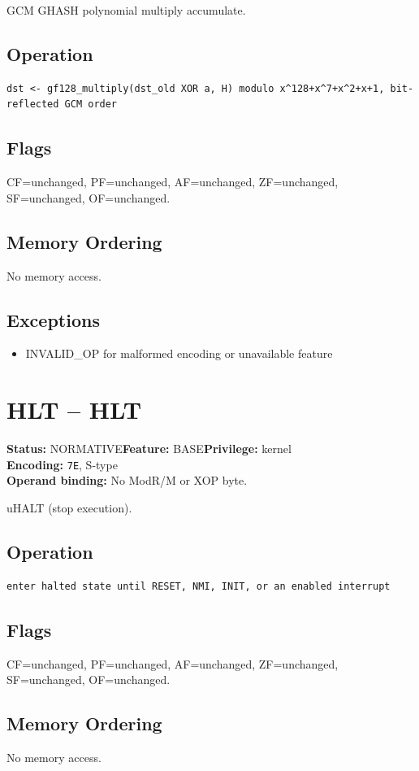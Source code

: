 \documentclass[10pt]{article}
\begin{document}
GCM GHASH polynomial multiply accumulate.

\subsection*{Operation}
\begin{lstlisting}
dst <- gf128_multiply(dst_old XOR a, H) modulo x^128+x^7+x^2+x+1, bit-reflected GCM order
\end{lstlisting}
\subsection*{Flags}
CF=unchanged, PF=unchanged, AF=unchanged, ZF=unchanged, SF=unchanged, OF=unchanged.
\subsection*{Memory Ordering}
No memory access.
\subsection*{Exceptions}
\begin{itemize}
\item INVALID\_OP for malformed encoding or unavailable feature
\end{itemize}
\clearpage

\section{HLT -- HLT}
\textbf{Status:} NORMATIVE\quad \textbf{Feature:} BASE\quad \textbf{Privilege:} kernel\\
\textbf{Encoding:} \texttt{7E}, S-type\\
\textbf{Operand binding:} No ModR/M or XOP byte.

uHALT (stop execution).

\subsection*{Operation}
\begin{lstlisting}
enter halted state until RESET, NMI, INIT, or an enabled interrupt
\end{lstlisting}
\subsection*{Flags}
CF=unchanged, PF=unchanged, AF=unchanged, ZF=unchanged, SF=unchanged, OF=unchanged.
\subsection*{Memory Ordering}
No memory access.
\end{document}
